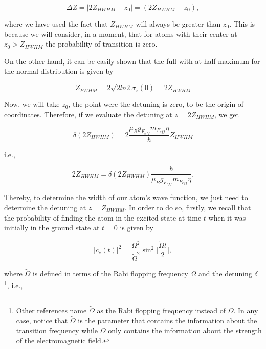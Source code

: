 \documentclass{article}
\begin{document}
\begin{equation}\label{width_atomic_wave_function}
  \Delta Z = |2Z_{HWHM} - z_{0}| = (2Z_{HWHM} - z_{0}),
\end{equation}

where we have used the fact that $Z_{HWHM}$ will always be greater than $z_{0}$. This is because we will consider, in a moment, that for atoms with their center at $z_{0} > Z_{HWHM}$ the probability of transition is zero.

On the other hand, it can be easily shown that the full with at half maximum for the normal distribution is given by

\begin{equation}\label{FWHM_normal_distribution}
Z_{FWHM} = 2\sqrt{2ln2} \sigma_{z}(0) = 2 Z_{HWHM}
\end{equation}

Now, we will take $z_{0}$, the point were the detuning is zero, to be the origin of coordinates. Therefore, if we evaluate the detuning at $z = 2Z_{HWHM}$, we get

\begin{equation}
  \delta (2Z_{HWHM}) = 2\frac{\mu_{B} g_{F_{eff}} m_{F_{eff}} \eta}{\hbar} Z_{HWHM}
\end{equation}

i.e.,

\begin{equation}\label{position_at_zhwhm}
  2Z_{HWHM} = \delta (2Z_{HWHM}) \frac{\hbar}{\mu_{B} g_{F_{eff}} m_{F_{eff}} \eta}.
\end{equation}

Thereby, to determine the width of our atom's wave function, we just need to determine the detuning at $z = Z_{HWHM}$. In order to do so, firstly, we recall that the probability of finding the atom in the excited state at time $t$ when it was initially in the ground state at $t=0$ is given by

\begin{equation}\label{rabi_oscillations_exact}
  |c_{e}(t)|^{2} =\frac{\Omega^{2}}{\tilde{\Omega}^{2}} \sin^{2}\bigg[\frac{\tilde{\Omega} t}{2} \bigg],
\end{equation}

where $\tilde{\Omega}$ is defined in terms of the Rabi flopping frequency $\Omega$ and the detuning $\delta$\footnote{Other references name $\tilde{\Omega}$ as the Rabi flopping frequency instead of $\Omega$. In any case, notice that $\tilde{\Omega}$ is the parameter that contains the information about the transition frequency while $\Omega$ only contains the information about the strength of the electromagnetic field.}, i.e.,
\end{document}
